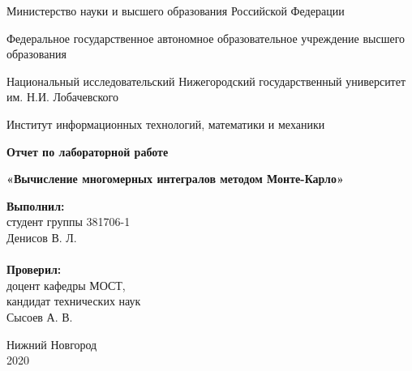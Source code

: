 \documentclass{report}
\begin{document}
\begin{titlepage}

\begin{center}
Министерство науки и высшего образования Российской Федерации
\end{center}
\begin{center}
Федеральное государственное автономное образовательное учреждение высшего образования
\end{center}
\begin{center}
Национальный исследовательский Нижегородский государственный университет им. Н.И. Лобачевского
\end{center}
\begin{center}
Институт информационных технологий, математики и механики
\end{center}

\vspace{4em}

\begin{center}
\textbf{Отчет по лабораторной работе} \\
\end{center}
\begin{center}
\textbf{«Вычисление многомерных интегралов методом Монте-Карло»} \\
\end{center}

\vspace{4em}

\newbox{\lbox}
\newlength{\maxl}
\setlength{\maxl}{\wd\lbox}
\hfill\parbox{7cm}{
\hspace*{5cm}\hspace*{-5cm}\textbf{Выполнил:} \\ студент группы 381706-1 \\ Денисов В. Л.\\
\\
\hspace*{5cm}\hspace*{-5cm}\textbf{Проверил:}\\ доцент кафедры МОСТ, \\ кандидат технических наук \\ Сысоев А. В.
}

\vspace{\fill}

\begin{center} Нижний Новгород \\ 2020 \end{center}

\end{titlepage}
\end{document}
